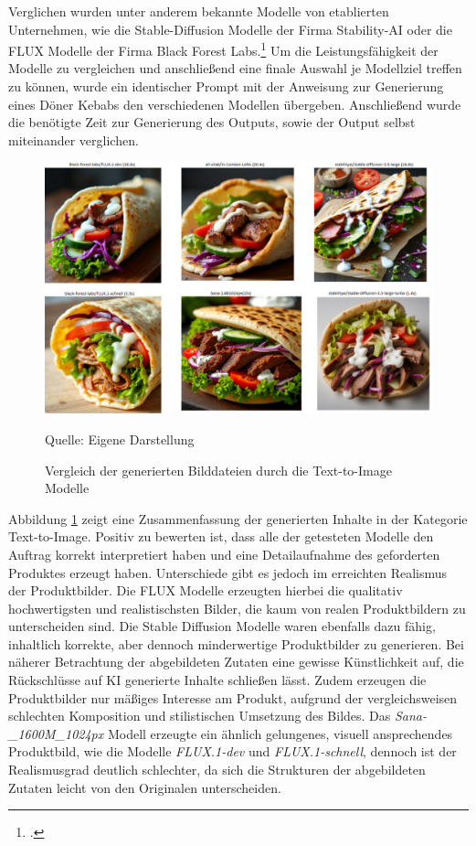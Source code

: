 Verglichen wurden unter anderem bekannte Modelle von etablierten Unternehmen, wie die Stable-Diffusion Modelle der Firma Stability-AI oder die FLUX Modelle der Firma Black Forest Labs.\footcite{stabilityai,blackforestlabs}
Um die Leistungsfähigkeit der Modelle zu vergleichen und anschließend eine finale Auswahl je Modellziel treffen zu können, wurde ein identischer Prompt mit der Anweisung zur Generierung eines Döner Kebabs den verschiedenen Modellen übergeben.
Anschließend wurde die benötigte Zeit zur Generierung des Outputs, sowie der Output selbst miteinander verglichen.
\clearpage
\begin{figure}[htbp]
    \centering
    \includegraphics[width=\textwidth]{abbildungen/Results_image_generation}
    \caption{Vergleich der generierten Bilddateien durch die Text-to-Image Modelle}
    \label{fig:results_image_generation}
    \raggedright Quelle: Eigene Darstellung
\end{figure}

Abbildung \ref{fig:results_image_generation} zeigt eine Zusammenfassung der generierten Inhalte in der Kategorie Text-to-Image.
Positiv zu bewerten ist, dass alle der getesteten Modelle den Auftrag korrekt interpretiert haben und eine Detailaufnahme des geforderten Produktes erzeugt haben.
Unterschiede gibt es jedoch im erreichten Realismus der Produktbilder.
Die FLUX Modelle erzeugten hierbei die qualitativ hochwertigsten und realistischsten Bilder, die kaum von realen Produktbildern zu unterscheiden sind.
Die Stable Diffusion Modelle waren ebenfalls dazu fähig, inhaltlich korrekte, aber dennoch minderwertige Produktbilder zu generieren.
Bei näherer Betrachtung der abgebildeten Zutaten eine gewisse Künstlichkeit auf, die Rückschlüsse auf \ac{KI} generierte Inhalte schließen lässt.
Zudem erzeugen die Produktbilder nur mäßiges Interesse am Produkt, aufgrund der vergleichsweisen schlechten Komposition und stilistischen Umsetzung des Bildes.
Das \textit{Sana-\_1600M\_1024px} Modell erzeugte ein ähnlich gelungenes, visuell ansprechendes Produktbild, wie die Modelle \textit{FLUX.1-dev} und \textit{FLUX.1-schnell}, dennoch ist der Realismusgrad deutlich schlechter, da sich die Strukturen der abgebildeten Zutaten leicht von den Originalen unterscheiden.

